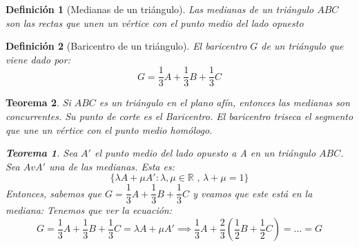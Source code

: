 \documentclass[11pt, a4paper, titlepage]{article}
\newcommand{\R}{\mathbb{R}}
\theoremstyle{theorem-style}
\newtheorem*{nth}{Teorema}
\theoremstyle{definition-style}
\newtheorem*{ndef}{Definición}
\theoremstyle{remark-style}
\theoremstyle{example-style}
\begin{document}
\begin{ndef}[Medianas de un triángulo]
Las medianas de un triángulo $ABC$ son las rectas que unen un vértice con el punto medio del lado opuesto
\end{ndef}
\begin{ndef}[Baricentro de un triángulo]
	El baricentro $G$ de un triángulo que viene dado por:
	\[
	G = \dfrac{1}{3} A +  \dfrac{1}{3} B +  \dfrac{1}{3} C
	\]
\end{ndef}

\begin{nth}
	Si $ABC$ es un triángulo en el plano afín, entonces las medianas son concurrentes. Su punto de corte es el Baricentro. El baricentro triseca el segmento que une un vértice con el punto medio homólogo.
	
	\begin{nth}
	Sea $A'$ el punto medio del lado opuesto a A en un triángulo $ABC$. Sea $AvA'$ una de las medianas. Esta es:
	\[
	\{\lambda A + \mu A': \lambda, \mu \in \R \text{ , } \lambda+\mu = 1\}
	\]
	Entonces, sabemos que $G = \dfrac{1}{3} A +  \dfrac{1}{3} B +  \dfrac{1}{3} C$ y veamos que este está en la mediana: Tenemos que ver la ecuación:
	\[
	G = \dfrac{1}{3} A +  \dfrac{1}{3} B +  \dfrac{1}{3} C = \lambda A + \mu A'  \implies \dfrac{1}{3}A + \dfrac{2}{3}(\dfrac{1}{2}B+\dfrac{1}{2}C) = ... = G
	\]
	
\end{nth}
\end{nth}
\end{document}

